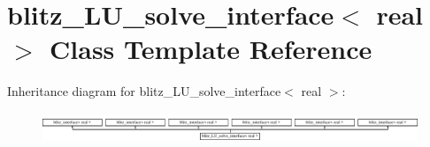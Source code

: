 \hypertarget{classblitz___l_u__solve__interface}{}\section{blitz\+\_\+\+L\+U\+\_\+solve\+\_\+interface$<$ real $>$ Class Template Reference}
\label{classblitz___l_u__solve__interface}
Inheritance diagram for blitz\+\_\+\+L\+U\+\_\+solve\+\_\+interface$<$ real $>$\+:\begin{figure}[H]
\begin{center}
\leavevmode
\includegraphics[height=0.915033cm]{classblitz___l_u__solve__interface}
\end{center}
\end{figure}
